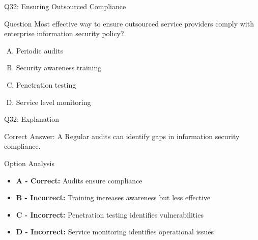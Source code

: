 \documentclass{beamer}
\begin{document}
	\begin{frame}{Q32: Ensuring Outsourced Compliance}
		\begin{block}{Question}
			Most effective way to ensure outsourced service providers comply with enterprise information security policy?
		\end{block}
		\begin{enumerate}[(A)]
			\item Periodic audits
			\item Security awareness training
			\item Penetration testing
			\item Service level monitoring
		\end{enumerate}
	\end{frame}
	
	\begin{frame}{Q32: Explanation}
		\begin{block}{Correct Answer: A}
			Regular audits can identify gaps in information security compliance.
		\end{block}
		\begin{block}{Option Analysis}
			\begin{itemize}
				\item \textbf{A - Correct:} Audits ensure compliance
				\item \textbf{B - Incorrect:} Training increases awareness but less effective
				\item \textbf{C - Incorrect:} Penetration testing identifies vulnerabilities
				\item \textbf{D - Incorrect:} Service monitoring identifies operational issues
			\end{itemize}
		\end{block}
	\end{frame}
	
	
	
\end{document}
